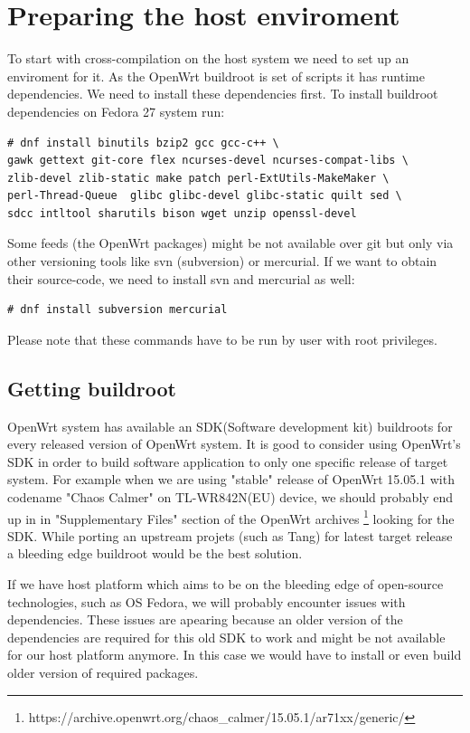 \section{Preparing the host enviroment}

To start with cross-compilation on the host system we need to set up an enviroment for it.
As the OpenWrt buildroot is set of scripts it has runtime dependencies.
We need to install these dependencies first.
To install buildroot dependencies on Fedora 27 system run:
\begin{lstlisting}[columns=fixed,basicstyle=\ttfamily\footnotesize,tabsize=4,backgroundcolor=\color{yellow!10}]
# dnf install binutils bzip2 gcc gcc-c++ \
gawk gettext git-core flex ncurses-devel ncurses-compat-libs \
zlib-devel zlib-static make patch perl-ExtUtils-MakeMaker \
perl-Thread-Queue  glibc glibc-devel glibc-static quilt sed \
sdcc intltool sharutils bison wget unzip openssl-devel
\end{lstlisting}
Some feeds (the OpenWrt packages) might be not available over git but only via other versioning tools like svn (subversion) or mercurial.
If we want to obtain their source-code, we need to install svn and mercurial as well:
\begin{lstlisting}[columns=fixed,basicstyle=\ttfamily\footnotesize,tabsize=4,backgroundcolor=\color{yellow!10}]
# dnf install subversion mercurial
\end{lstlisting}
Please note that these commands have to be run by user with root privileges.

\subsection{Getting buildroot}

OpenWrt system has available an SDK(Software development kit) buildroots for every released version of OpenWrt system.
It is good to consider using OpenWrt's SDK in order to build software application to only one specific release of target system.
For example when we are using "stable" release of OpenWrt 15.05.1 with codename "Chaos Calmer" on TL-WR842N(EU) device, we should probably end up in in "Supplementary Files" section of the OpenWrt archives
\footnote{https://archive.openwrt.org/chaos\_calmer/15.05.1/ar71xx/generic/} looking for the SDK.
While porting an upstream projets (such as Tang) for latest target release a bleeding edge buildroot would be the best solution.

If we have host platform which aims to be on the bleeding edge of open-source technologies, such as OS Fedora, we will probably encounter issues with dependencies.
These issues are apearing because an older version of the dependencies are required for this old SDK to work and might be not available for our host platform anymore.
In this case we would have to install or even build older version of required packages.

